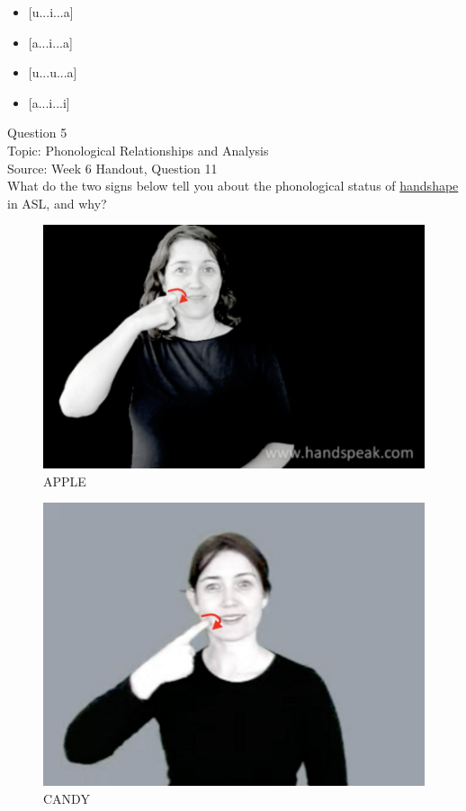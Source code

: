 \documentclass[12pt]{article}
\begin{document}
\begin{itemize} \item {[u...i...a]} \item {[a...i...a]} \item {[u...u...a]} \item {[a...i...i]} \end{itemize}


\newpage

{\large Question 5}\\

Topic: Phonological Relationships and Analysis\\
Source: Week 6 Handout, Question 11\\

What do the two signs below tell you about the phonological status of \underline{handshape} in ASL, and why?\\

\begin{figure}[H]
\includegraphics{../images/asl_apple.png}
\caption{APPLE}
\end{figure}
\begin{figure}[H]
\includegraphics{../images/asl_candy.png}
\caption{CANDY}
\end{figure}
\end{document}

